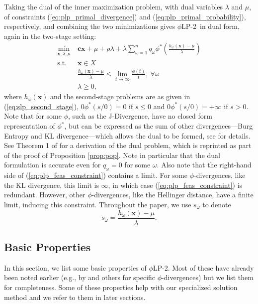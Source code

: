 \documentclass[ijoc,letterpaper]{informs3} %
\newcommand{\x}{\mathbf{x}}
\renewcommand{\c}{\mathbf{c}}
\newcommand{\st}{\mbox{s.t.}}
\newcommand{\plp}{$\phi$LP-2}
\begin{document}
Taking the dual of the inner maximization problem, with dual variables $\lambda$ and $\mu$, of constraints (\ref{eq:plp_primal_divergence}) and (\ref{eq:plp_primal_probability}), respectively, and combining the two minimizations gives \plp\ in dual form, again in the two-stage setting:
\begin{align}
	\min_{\x,\lambda,\mu} \ & \c\x + \mu + \rho \lambda + \lambda \sum_{\omega=1}^{n} q_\omega \phi^*\left(\frac{h_\omega(\x) - \mu}{\lambda}\right) \label{eq:plp_two_stage} \\
	\st \ & \x \in X \nonumber \\
	& \frac{h_\omega(\x) - \mu}{\lambda} \leq \lim_{t \rightarrow \infty} \frac{\phi(t)}{t}, \ \forall \omega \label{eq:plp_feas_constraint}\\
	& \lambda \geq 0, \nonumber
\end{align}
where $h_\omega(\x)$ and the second-stage problems are as given in (\ref{eq:slp_second_stage}), $0\phi^*(s/0)=0$ if $s\leq 0$ and  $0\phi^*(s/0)=+\infty$ if $s > 0$.
Note that for some $\phi$, such as the J-Divergence, have no closed form representation of $\phi^*$, but can be expressed as the sum of other divergences---Burg Entropy and KL divergence---which allows the dual to be formed, see \citep{bental2011robust} for details.
See Theorem 1 of \cite{bental2011robust} for a derivation of the dual problem, which is reprinted as part of the proof of Proposition \ref{prop:pop}.
Note in particular that the dual formulation is accurate even for $q_\omega = 0$ for some $\omega$.
Also note that the right-hand side of (\ref{eq:plp_feas_constraint}) contains a limit.
For some $\phi$-divergences, like the KL divergence, this limit is $\infty$, in which case (\ref{eq:plp_feas_constraint}) is redundant.
However, other $\phi$-divergences, like the Hellinger distance, have a finite limit, inducing this constraint.
Throughout the paper, we use $s_\omega$ to denote
\begin{equation}
	s_\omega = \frac{h_\omega(\x) - \mu}{\lambda}. \label{eq:s_omega_definition}
\end{equation}


\subsection{Basic Properties}
\label{ssec:basicprop}

In this section, we list some basic properties of \plp.
Most of these have already been noted earlier (e.g., by \cite{bental2011robust} and others for specific $\phi$-divergences) but we list them for completeness.
Some of these properties help with our specialized solution method and we refer to them in later sections.
\end{document}
